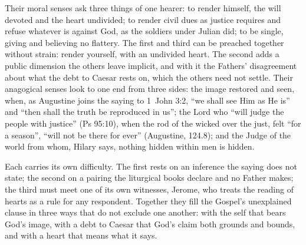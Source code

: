 Their moral senses ask three things of one hearer: to render himself, the will
devoted and the heart undivided; to render civil dues as justice requires and
refuse whatever is against God, as the soldiers under Julian did; to be single,
giving and believing no flattery. The first and third can be preached together
without strain: render yourself, with an undivided heart. The second adds a
public dimension the others leave implicit, and with it the Fathers'
disagreement about what the debt to Caesar rests on, which the others need not
settle. Their anagogical senses look to one end from three sides: the image
restored and seen, when, as Augustine joins the saying to 1~John 3:2, ``we
shall see Him as He is'' and ``then shall the truth be reproduced in us''; the
Lord who ``will judge the people with justice'' (Ps 95:10), when the rod of the
wicked over the just, felt ``for a season'', ``will not be there for ever''
(Augustine,  124.8); and the Judge of the world
from whom, Hilary says, nothing hidden within men is hidden.

Each carries its own difficulty. The first rests on an inference the saying
does not state; the second on a pairing the liturgical books declare and no
Father makes; the third must meet one of its own witnesses, Jerome, who treats
the reading of hearts as a rule for any respondent. Together they fill the
Gospel's unexplained clause in three ways that do not exclude one another: with
the self that bears God's image, with a debt to Caesar that God's claim both
grounds and bounds, and with a heart that means what it says.
